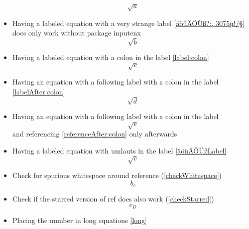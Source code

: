 \documentclass{article}
\def\ifcleveref#1{#1}%
\def\ifcleveref#1{}%
\begin{document}
\begin{itemize}
			\begin{equation}\label{unreferenced}
				\sqrt{a}
			\end{equation}
		\item Having a labeled equation with a very strange label \ref{äöüÄÖÜß?:, 3075µ!/§} does only work without package inputenx
			\begin{equation}\label{äöüÄÖÜß?:, 3075µ!/§}
				\sqrt{b}
			\end{equation}
		\item Having a labeled equation with a colon in the label \ref{label:colon}
			\begin{equation}\label{label:colon}
				\sqrt{c}
			\end{equation}
		\item Having an equation with a following label with a colon in the label \ref{labelAfter:colon}
			\begin{equation}
				\sqrt{d}\label{labelAfter:colon}
			\end{equation}
		\item Having an equation with a following label with a colon in the label
			\begin{equation}
				\sqrt{e}\label{referenceAfter:colon}
			\end{equation}
			and referencing \ref{referenceAfter:colon} only afterwards
		\item Having a labeled equation with umlauts in the label \ref{äöüÄÖÜßLabel}
			\begin{equation}\label{äöüÄÖÜßLabel}
				\sqrt{c}
			\end{equation}
		\item Check for spurious whitespace around reference (\ref{checkWhitespace})
			\begin{equation}\label{checkWhitespace}
				b_c
			\end{equation}
		\item Check if the starred version of ref does also work (\ref*{checkStarred})
			\begin{equation}\label{checkStarred}
				c_D
			\end{equation}
		\ifcleveref{
			\item Check if the starred version of cref does also work (\cref*{checkStarredCref})
				\begin{equation}\label{checkStarredCref}
					d_E
				\end{equation}
		}
		\item Placing the number in long equations \ref{long}
			\begin{equation}\label{long}

\end{equation}
\end{itemize}
\end{document}
